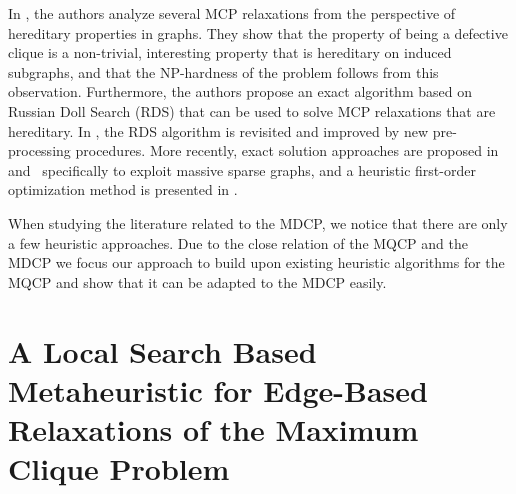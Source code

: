 \documentclass[draft,final]{vutinfth} %
\begin{document}
In \cite{Trukhanov2013}, the authors analyze several MCP relaxations from the perspective of hereditary properties in graphs. They show that the property of being a defective clique is a non-trivial, interesting property that is hereditary on induced subgraphs, and that the NP-hardness of the problem follows from this observation. Furthermore, the authors propose an exact algorithm based on Russian Doll Search (RDS) that can be used to solve MCP relaxations that are hereditary. In \cite{GSCHWIND2018131}, the RDS algorithm is revisited and improved by new pre-processing procedures. 
More recently, exact solution approaches are proposed in~\cite{chen2021computing} and~\cite{gao2022exact} specifically to exploit massive sparse graphs, and a heuristic first-order optimization method is presented in \cite{bomze2022fast}. 

When studying the literature related to the MDCP, we notice that there are only a few heuristic approaches. Due to the close relation of the MQCP and the MDCP we focus our approach to build upon existing heuristic algorithms for the MQCP and show that it can be adapted to the MDCP easily. 

\chapter{A Local Search Based Metaheuristic for Edge-Based Relaxations of the Maximum Clique Problem}\label{chp:local-search-algorithm}
\end{document}
